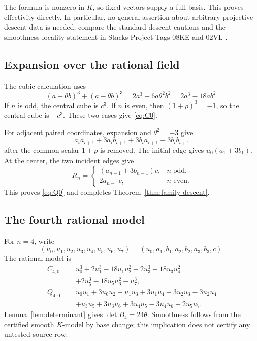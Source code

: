 The formula is nonzero in \(K\), so fixed vectors supply a full basis.
This proves effectivity directly.  In particular, no general assertion
about arbitrary projective descent data is needed; compare the standard
descent cautions and the smoothness-locality statement in Stacks Project
Tags 08KE and 02VL \cite{StacksProject}.

\subsection{Expansion over the rational field}

The cubic calculation uses
\[
(a+\theta b)^3+(a-\theta b)^3
=2a^3+6a\theta^2b^2=2a^3-18ab^2.
\]
If \(n\) is odd, the central cube is \(c^3\).  If \(n\) is even, then
\((1+\rho)^3=-1\), so the central cube is \(-c^3\).  These two cases
give \eqref{eq:C0}.

For adjacent paired coordinates, expansion and
\(\theta^2=-3\) give
\[
a_ia_{i+1}+3a_ib_{i+1}+3b_ia_{i+1}-3b_ib_{i+1}
\]
after the common scalar \(1+\rho\) is removed.  The initial edge gives
\(u_0(a_1+3b_1)\).  At the center, the two incident edges give
\[
R_n=\begin{cases}
(a_{n-1}+3b_{n-1})c,&n\text{ odd},\\
2a_{n-1}c,&n\text{ even}.
\end{cases}
\]
This proves \eqref{eq:Q0} and completes
Theorem~\ref{thm:family-descent}.

\subsection{The fourth rational model}

For \(n=4\), write
\[
(u_0,u_1,u_2,u_3,u_4,u_5,u_6,u_7)
=(u_0,a_1,b_1,a_2,b_2,a_3,b_3,c).
\]
The rational model is
\begin{align*}
C_{4,0}={}&u_0^3+2u_1^3-18u_1u_2^2
+2u_3^3-18u_3u_4^2\\
&+2u_5^3-18u_5u_6^2-u_7^3,\\
Q_{4,0}={}&u_0u_1+3u_0u_2+u_1u_3+3u_1u_4
+3u_2u_3-3u_2u_4\\
&+u_3u_5+3u_3u_6+3u_4u_5-3u_4u_6+2u_5u_7.
\end{align*}
Lemma~\ref{lem:determinant} gives \(\det B_4=24\theta\).
Smoothness follows from the certified smooth \(K\)-model by base change;
this implication does not certify any untested source row.

